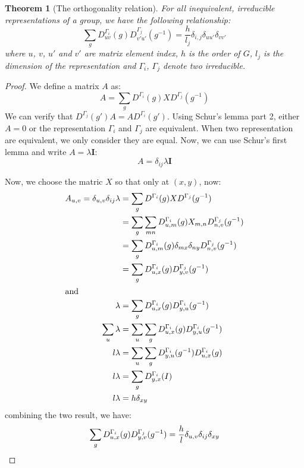 \documentclass{amsart}
\newtheorem*{theorem}{Theorem}
\theoremstyle{remark}
\theoremstyle{remark}
\theoremstyle{definition}
\begin{document}
\begin{theorem}
    [The orthogonality relation]
    For all inequivalent, irreducible representations of a group, we have the following relationship:
    \begin{equation*}
        \sum_g D^{\Gamma_i}_{uv}(g)D^{\Gamma_j}_{v'u'}(g^{-1}) = \frac{h}{l_j} \delta_{i,j}\delta_{uu'}\delta_{vv'}
    \end{equation*}
    where $u$, $v$, $u'$ and $v'$ are matrix element index, $h$ is the order of $G$, $l_j$ is the dimension of 
    the representation and $\Gamma_i$, $\Gamma_j$ denote two irreducible.
\end{theorem}
\begin{proof}
We define a matrix $A$ as:
\begin{equation*}
    A = \sum_{g} D^{\Gamma_i}(g) X D^{\Gamma_j}(g^{-1})
\end{equation*}
We can verify that $D^{\Gamma_j}(g')A = A D^{\Gamma_i}(g')$. Using Schur's lemma part 2, 
either $A=0$ or the representation $\Gamma_i$ and $\Gamma_j$ are equivalent. When two representation 
are equivalent, we only consider they are equal. 
Now, we can use Schur's first lemma and write $A = \lambda \mathbf{I}$:
\begin{equation*}
    A = \delta_{ij} \lambda \mathbf{I}
\end{equation*}

Now, we choose the matric $X$ so that only at $(x,y)$, now:
\begin{align*}
    A_{u,v} = \delta_{u,v} \delta_{ij} \lambda 
    &= \sum_{g} D^{\Gamma_i}(g) X D^{\Gamma_j}(g^{-1}) \\
    &= \sum_{g} \sum_{mn} D^{\Gamma_i}_{u,m}(g) X_{m,n} D^{\Gamma_j}_{n,v}(g^{-1}) \\
    &= \sum_{g}  D^{\Gamma_i}_{u,m}(g) \delta_{mx}\delta_{ny} D^{\Gamma_j}_{n,v}(g^{-1}) \\
    &= \sum_{g}  D^{\Gamma_i}_{u,x}(g) D^{\Gamma_j}_{y,v}(g^{-1}) \\
\intertext{and}
    \lambda &= \sum_{g}  D^{\Gamma_i}_{u,x}(g) D^{\Gamma_i}_{y,u}(g^{-1}) \\ 
    \sum_u \lambda &= \sum_u \sum_{g}  D^{\Gamma_i}_{u,x}(g) D^{\Gamma_i}_{y,u}(g^{-1}) \\
    l\lambda &= \sum_u \sum_{g} D^{\Gamma_i}_{y,u}(g^{-1}) D^{\Gamma_i}_{u,x}(g) \\
    l\lambda &= \sum_{g} D^{\Gamma_i}_{y,x}(I) \\
    l\lambda &= h\delta_{xy} \\
\end{align*}
combining the two result, we have:
\begin{equation*}
    \sum_{g}  D^{\Gamma_i}_{u,x}(g) D^{\Gamma_j}_{y,v}(g^{-1}) 
    = \frac{h}{l} \delta_{u,v} \delta_{ij} \delta_{xy} \qedhere
\end{equation*}
\end{proof}
\end{document}
